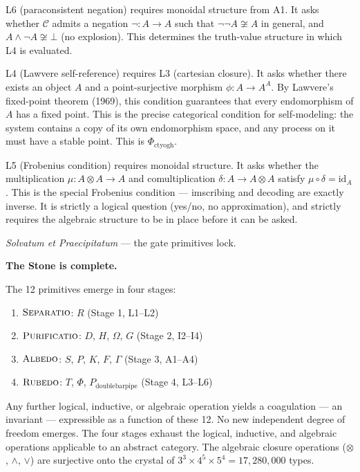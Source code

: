 \documentclass[12pt,a4paper]{article}
\newcommand{\Separatio}{\textsc{Separatio}}
\newcommand{\Purificatio}{\textsc{Purificatio}}
\newcommand{\Albedo}{\textsc{Albedo}}
\newcommand{\Rubedo}{\textsc{Rubedo}}
\begin{document}
L6 (paraconsistent negation) requires monoidal structure from A1. It asks whether $\mathcal{C}$ admits a negation $\neg: A \to A$ such that $\neg\neg A \not\cong A$ in general, and $A \wedge \neg A \not\cong \bot$ (no explosion). This determines the truth-value structure in which L4 is evaluated.

L4 (Lawvere self-reference) requires L3 (cartesian closure). It asks whether there exists an object $A$ and a point-surjective morphism $\phi: A \to A^A$. By Lawvere's fixed-point theorem (1969), this condition guarantees that every endomorphism of $A$ has a fixed point. This is the precise categorical condition for self-modeling: the system contains a copy of its own endomorphism space, and any process on it must have a stable point. This is $\Phi_{\text{ctyogh}}$.

L5 (Frobenius condition) requires monoidal structure. It asks whether the multiplication $\mu: A \otimes A \to A$ and comultiplication $\delta: A \to A \otimes A$ satisfy $\mu \circ \delta = \text{id}_A$. This is the special Frobenius condition --- imscribing and decoding are exactly inverse. It is strictly a logical question (yes/no, no approximation), and strictly requires the algebraic structure to be in place before it can be asked.

\textit{Solvatum et Praecipitatum} --- the gate primitives lock.

\bigskip
\noindent\textbf{The Stone is complete.}

The 12 primitives emerge in four stages:
\begin{enumerate}
    \item $\Separatio$: $R$ (Stage 1, L1--L2)
    \item $\Purificatio$: $D$, $H$, $\Omega$, $G$ (Stage 2, I2--I4)
    \item $\Albedo$: $S$, $P$, $K$, $F$, $\Gamma$ (Stage 3, A1--A4)
    \item $\Rubedo$: $T$, $\Phi$, $P_{\text{doublebarpipe}}$ (Stage 4, L3--L6)
\end{enumerate}

Any further logical, inductive, or algebraic operation yields a coagulation --- an invariant --- expressible as a function of these 12. No new independent degree of freedom emerges. The four stages exhaust the logical, inductive, and algebraic operations applicable to an abstract category. The algebraic closure operations ($\otimes$, $\wedge$, $\vee$) are surjective onto the crystal of $3^3 \times 4^5 \times 5^4 = 17,280,000$ types.
\end{document}

